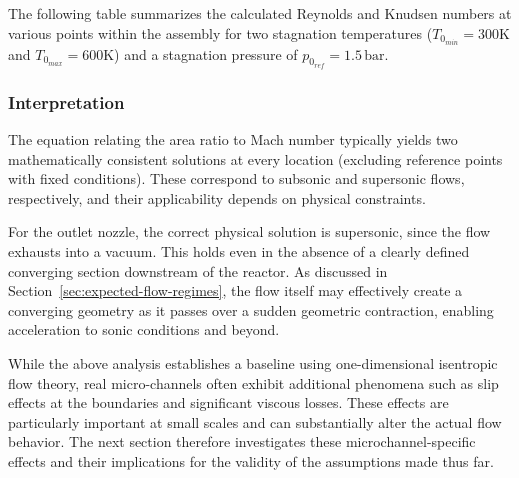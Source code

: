 	The following table summarizes the calculated Reynolds and Knudsen numbers at various points within the assembly for two stagnation temperatures ($T_{0_{min}} = 300 \text{K}$ and $T_{0_{max}} = 600 \text{K}$) and a stagnation pressure of $p_{0_{ref}} = 1.5\,\text{bar}$.

	

	\newpage

\subsubsection*{Interpretation}

	The equation relating the area ratio to Mach number typically yields two mathematically consistent solutions at every location (excluding reference points with fixed conditions).
	These correspond to subsonic and supersonic flows, respectively, and their applicability depends on physical constraints.

	For the outlet nozzle, the correct physical solution is supersonic, since the flow exhausts into a vacuum.
	This holds even in the absence of a clearly defined converging section downstream of the reactor.
	As discussed in Section~\ref{sec:expected-flow-regimes}, the flow itself may effectively create a converging geometry as it passes over a sudden geometric contraction, enabling acceleration to sonic conditions and beyond.

	While the above analysis establishes a baseline using one-dimensional isentropic flow theory, real micro-channels often exhibit additional phenomena such as slip effects at the boundaries and significant viscous losses.
	These effects are particularly important at small scales and can substantially alter the actual flow behavior.
	The next section therefore investigates these microchannel-specific effects and their implications for the validity of the assumptions made thus far.
